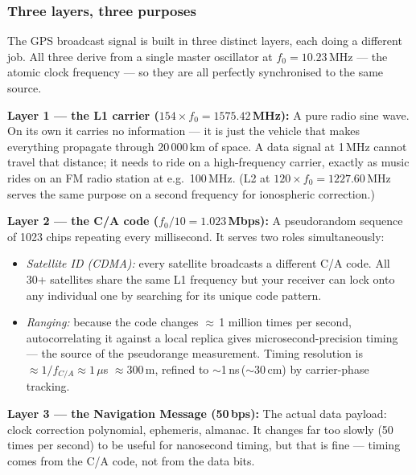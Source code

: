 \documentclass[12pt, a4paper]{article}
\begin{document}
\subsubsection*{Three layers, three purposes}

The GPS broadcast signal is built in three distinct layers, each doing a
different job.
All three derive from a single master oscillator at
$f_0 = 10.23$\,MHz --- the atomic clock frequency --- so they are all
perfectly synchronised to the same source.

\textbf{Layer 1 --- the L1 carrier ($154 \times f_0 = 1575.42$\,MHz):}
A pure radio sine wave.
On its own it carries no information --- it is just the vehicle that makes
everything propagate through 20\,000\,km of space.
A data signal at 1\,MHz cannot travel that distance; it needs to ride on a
high-frequency carrier, exactly as music rides on an FM radio station at
e.g.\ 100\,MHz.
(L2 at $120 \times f_0 = 1227.60$\,MHz serves the same purpose on a second
frequency for ionospheric correction.)

\textbf{Layer 2 --- the C/A code ($f_0/10 = 1.023$\,Mbps):}
A pseudorandom sequence of 1023 chips repeating every millisecond.
It serves two roles simultaneously:
\begin{itemize}[leftmargin=1.5em, itemsep=2pt]
  \item \emph{Satellite ID (CDMA):} every satellite broadcasts a different
    C/A code.
    All 30+ satellites share the same L1 frequency but your receiver can
    lock onto any individual one by searching for its unique code pattern.
  \item \emph{Ranging:} because the code changes $\approx$\,1 million
    times per second, autocorrelating it against a local replica gives
    microsecond-precision timing --- the source of the pseudorange
    measurement.
    Timing resolution is $\approx 1/f_{C/A} \approx 1\,\mu$s
    $\approx 300$\,m, refined to $\sim$1\,ns\,($\sim$30\,cm) by
    carrier-phase tracking.
\end{itemize}

\textbf{Layer 3 --- the Navigation Message (50\,bps):}
The actual data payload: clock correction polynomial, ephemeris, almanac.
It changes far too slowly (50 times per second) to be useful for
nanosecond timing, but that is fine --- timing comes from the C/A code,
not from the data bits.
\end{document}
